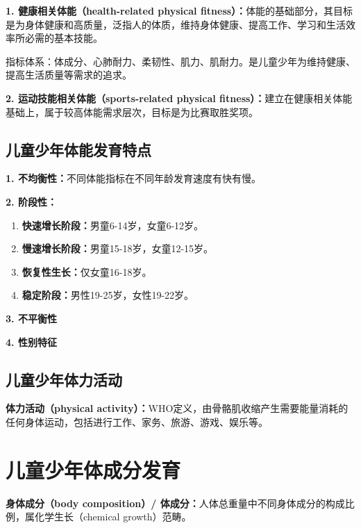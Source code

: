 \begin{keybox}
\textbf{1. 健康相关体能（health-related physical fitness）：}体能的基础部分，其目标是为身体健康和高质量，泛指人的体质，维持身体健康、提高工作、学习和生活效率所必需的基本技能。

指标体系：体成分、心肺耐力、柔韧性、肌力、肌耐力。是儿童少年为维持健康、提高生活质量等需求的追求。

\textbf{2. 运动技能相关体能（sports-related physical fitness）：}建立在健康相关体能基础上，属于较高体能需求层次，目标是为比赛取胜奖项。
\end{keybox}

\subsection{儿童少年体能发育特点}

\begin{keybox}
\textbf{1. 不均衡性：}不同体能指标在不同年龄发育速度有快有慢。

\textbf{2. 阶段性：}
\begin{enumerate}[leftmargin=*]
    \item \textbf{快速增长阶段：}男童6-14岁，女童6-12岁。
    \item \textbf{慢速增长阶段：}男童15-18岁，女童12-15岁。
    \item \textbf{恢复性生长：}仅女童16-18岁。
    \item \textbf{稳定阶段：}男性19-25岁，女性19-22岁。
\end{enumerate}

\textbf{3. 不平衡性}

\textbf{4. 性别特征}
\end{keybox}

\subsection{儿童少年体力活动}

\begin{defbox}
\textbf{体力活动（physical activity）：}WHO定义，由骨骼肌收缩产生需要能量消耗的任何身体运动，包括进行工作、家务、旅游、游戏、娱乐等。
\end{defbox}

\section{儿童少年体成分发育}

\begin{defbox}
\textbf{身体成分（body composition）/ 体成分：}人体总重量中不同身体成分的构成比例，属化学生长（chemical growth）范畴。
\end{defbox}

